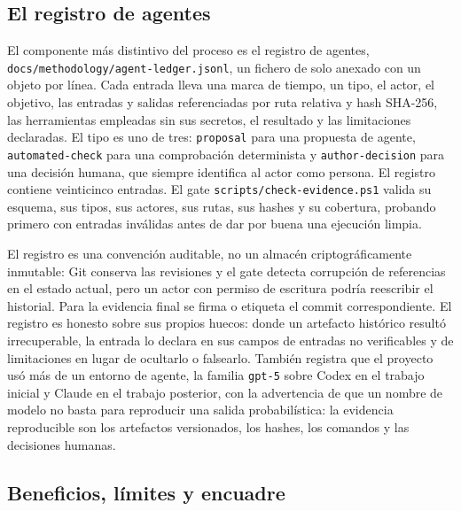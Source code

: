 \subsection{El registro de agentes}\label{sec:met-ledger}

El componente más distintivo del proceso es el registro de agentes,
\texttt{docs/methodology/agent-ledger.jsonl}, un fichero de solo anexado con un objeto por
línea. Cada entrada lleva una marca de tiempo, un tipo, el actor, el objetivo, las entradas y
salidas referenciadas por ruta relativa y hash SHA-256, las herramientas empleadas sin sus
secretos, el resultado y las limitaciones declaradas. El tipo es uno de tres:
\texttt{proposal} para una propuesta de agente, \texttt{automated-check} para una
comprobación determinista y \texttt{author-decision} para una decisión humana, que siempre
identifica al actor como persona. El registro contiene veinticinco entradas. El gate
\texttt{scripts/check-evidence.ps1} valida su esquema, sus tipos, sus actores, sus rutas, sus
hashes y su cobertura, probando primero con entradas inválidas antes de dar por buena una
ejecución limpia.

El registro es una convención auditable, no un almacén criptográficamente inmutable: Git
conserva las revisiones y el gate detecta corrupción de referencias en el estado actual, pero
un actor con permiso de escritura podría reescribir el historial. Para la evidencia final se
firma o etiqueta el commit correspondiente. El registro es honesto sobre sus propios huecos:
donde un artefacto histórico resultó irrecuperable, la entrada lo declara en sus campos de
entradas no verificables y de limitaciones en lugar de ocultarlo o falsearlo. También registra
que el proyecto usó más de un entorno de agente, la familia \texttt{gpt-5} sobre Codex en el
trabajo inicial y Claude en el trabajo posterior, con la advertencia de que un nombre de
modelo no basta para reproducir una salida probabilística: la evidencia reproducible son los
artefactos versionados, los hashes, los comandos y las decisiones humanas.

\subsection{Beneficios, límites y encuadre}\label{sec:met-encuadre}

